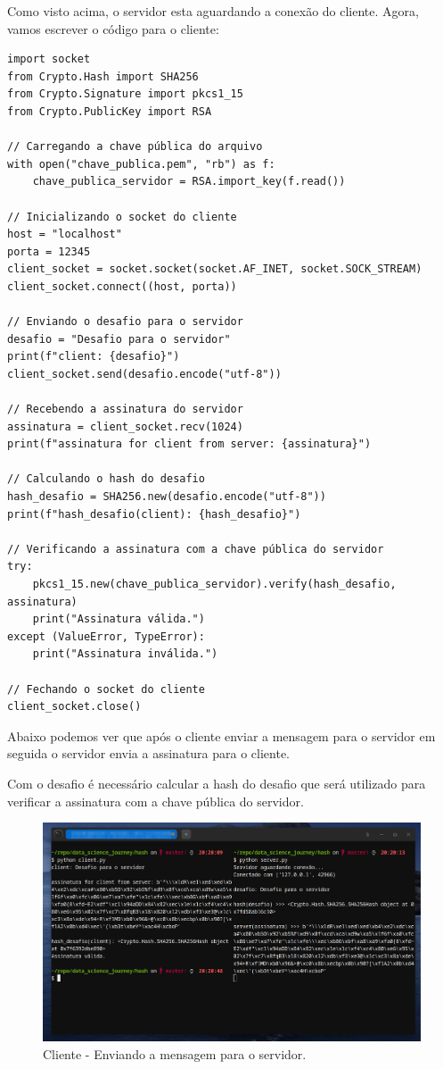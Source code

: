 \documentclass[a4paper,12pt]{article}
\begin{document}
Como visto acima, o servidor esta aguardando a conex\~ao
do cliente. Agora, vamos escrever o c\'odigo para o cliente:

\begin{listing}[!ht]
\begin{verbatim}
import socket
from Crypto.Hash import SHA256
from Crypto.Signature import pkcs1_15
from Crypto.PublicKey import RSA

// Carregando a chave pública do arquivo
with open("chave_publica.pem", "rb") as f:
    chave_publica_servidor = RSA.import_key(f.read())

// Inicializando o socket do cliente
host = "localhost"
porta = 12345
client_socket = socket.socket(socket.AF_INET, socket.SOCK_STREAM)
client_socket.connect((host, porta))

// Enviando o desafio para o servidor
desafio = "Desafio para o servidor"
print(f"client: {desafio}")
client_socket.send(desafio.encode("utf-8"))

// Recebendo a assinatura do servidor
assinatura = client_socket.recv(1024)
print(f"assinatura for client from server: {assinatura}")

// Calculando o hash do desafio
hash_desafio = SHA256.new(desafio.encode("utf-8"))
print(f"hash_desafio(client): {hash_desafio}")

// Verificando a assinatura com a chave pública do servidor
try:
    pkcs1_15.new(chave_publica_servidor).verify(hash_desafio, assinatura)
    print("Assinatura válida.")
except (ValueError, TypeError):
    print("Assinatura inválida.")

// Fechando o socket do cliente
client_socket.close()

\end{verbatim}
\end{listing}

Abaixo podemos ver que ap\'os o cliente enviar a mensagem para
o servidor em seguida o servidor envia a assinatura para o cliente.

Com o desafio \'e necess\'ario calcular a hash do desafio
que ser\'a utilizado para verificar a assinatura com a chave 
p\'ublica do servidor.

\begin{figure}[!t]
\centering 
\includegraphics[scale=0.38]{images/client.png}
\caption{Cliente - Enviando a mensagem para o servidor.}
\label{fig:server-running}
\end{figure}
\end{document}
